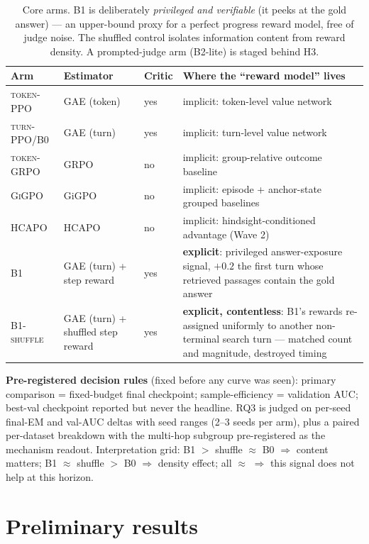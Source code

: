 \documentclass[11pt,a4paper]{article}
\newcommand{\arm}[1]{\textsc{#1}}
\begin{document}
\begin{table}[h]
\centering\small
\begin{tabular}{lllp{5.6cm}}
\toprule
Arm & Estimator & Critic & Where the ``reward model'' lives \\
\midrule
\arm{token-PPO}   & GAE (token)      & yes & implicit: token-level value network \\
\arm{turn-PPO/B0} & GAE (turn)       & yes & implicit: turn-level value network \\
\arm{token-GRPO}  & GRPO             & no  & implicit: group-relative outcome baseline \\
\arm{GiGPO}       & GiGPO            & no  & implicit: episode + anchor-state grouped baselines \\
\arm{HCAPO}       & HCAPO            & no  & implicit: hindsight-conditioned advantage (Wave 2) \\
\arm{B1}          & GAE (turn) + step reward & yes & \textbf{explicit}: privileged answer-exposure signal, $+0.2$ the first turn whose retrieved passages contain the gold answer \\
\arm{B1-shuffle}  & GAE (turn) + shuffled step reward & yes & \textbf{explicit, contentless}: B1's rewards re-assigned uniformly to another non-terminal search turn --- matched count and magnitude, destroyed timing \\
\bottomrule
\end{tabular}
\caption{Core arms. B1 is deliberately \emph{privileged and verifiable} (it peeks at the gold
answer) --- an upper-bound proxy for a perfect progress reward model, free of judge noise. The
shuffled control isolates information content from reward density. A prompted-judge arm
(B2-lite) is staged behind H3.}
\end{table}

\textbf{Pre-registered decision rules} (fixed before any curve was seen): primary comparison =
fixed-budget final checkpoint; sample-efficiency = validation AUC; best-val checkpoint reported
but never the headline. RQ3 is judged on per-seed final-EM and val-AUC deltas with seed ranges
(2--3 seeds per arm), plus a paired per-dataset breakdown with the multi-hop subgroup
pre-registered as the mechanism readout. Interpretation grid: B1 $>$ shuffle $\approx$ B0
$\Rightarrow$ content matters; B1 $\approx$ shuffle $>$ B0 $\Rightarrow$ density effect;
all $\approx$ $\Rightarrow$ this signal does not help at this horizon.

\section{Preliminary results}
\end{document}
